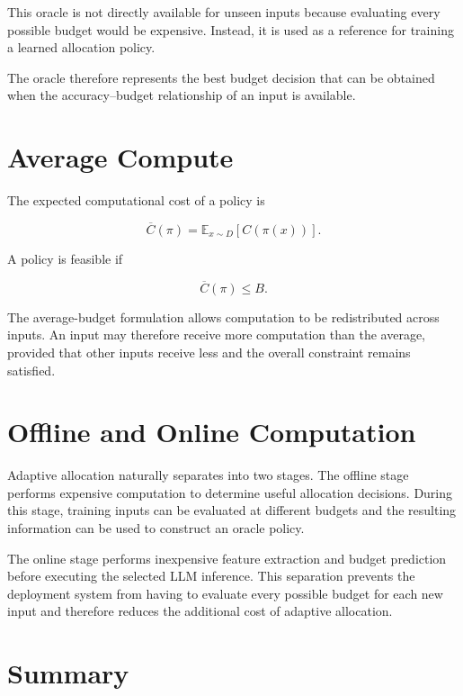 \documentclass[12pt,a4paper,titlepage]{report}
\begin{document}
This oracle is not directly available for unseen inputs because evaluating every possible budget would be expensive. Instead, it is used as a reference for training a learned allocation policy.

The oracle therefore represents the best budget decision that can be obtained when the accuracy--budget relationship of an input is available.

\section{Average Compute}

The expected computational cost of a policy is

\begin{equation}
\overline{C}(\pi)
=
\mathbb{E}_{x\sim D}
[C(\pi(x))].
\end{equation}

A policy is feasible if

\begin{equation}
\overline{C}(\pi)\leq B.
\end{equation}

The average-budget formulation allows computation to be redistributed across inputs. An input may therefore receive more computation than the average, provided that other inputs receive less and the overall constraint remains satisfied.

\section{Offline and Online Computation}

Adaptive allocation naturally separates into two stages. The offline stage performs expensive computation to determine useful allocation decisions. During this stage, training inputs can be evaluated at different budgets and the resulting information can be used to construct an oracle policy.

The online stage performs inexpensive feature extraction and budget prediction before executing the selected LLM inference. This separation prevents the deployment system from having to evaluate every possible budget for each new input and therefore reduces the additional cost of adaptive allocation.

\section{Summary}
\end{document}
